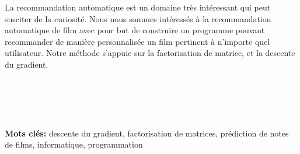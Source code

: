 \documentclass[a4paper,10pt]{article}
\begin{document}
La recommandation automatique est un domaine très intéressant qui peut susciter de la curiosité. Nous nous sommes intéressés à la recommandation 
automatique de film avec pour but de construire un programme pouvant recommander de manière personnalisée un film pertinent à n'importe quel utilisateur. Notre méthode s'appuie  
sur la factorisation de matrice, et la descente du gradient.\\ \\ \\ \\ \\ \\ 
 
\textbf{{Mots clés:}} descente du gradient, factorisation de matrices, prédiction de notes de films, informatique, programmation

\end{document}
